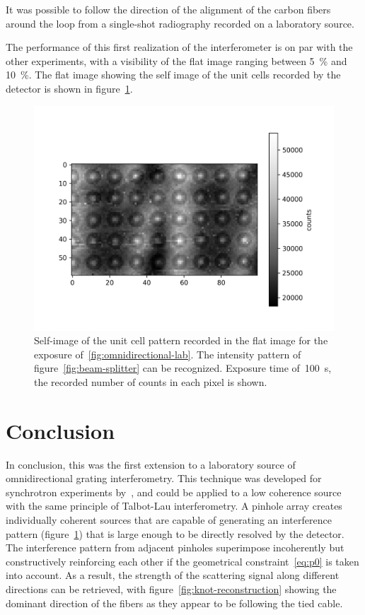 It was possible to follow the direction of the alignment of the
carbon fibers around the loop from a single-shot radiography recorded on a
laboratory source.

The performance of this first realization of the interferometer is on par
with the other experiments, with a visibility of the flat image ranging
between \SI{5}{\percent} and \SI{10}{\percent}. The flat image showing the
self image of the unit cells recorded by the detector is shown in
figure~\ref{fig:cells}.

\begin{figure}[htb]
    \centering
    \includegraphics[width=\textwidth]{gfx/omnidirectional/visibility-omnidirectional.png}
    \caption[Self-image of the omnidirectional interference pattern.]{Self-image of the unit cell pattern recorded in the flat image
        for the exposure of~\ref{fig:omnidirectional-lab}. The intensity
        pattern of figure~\ref{fig:beam-splitter} can be recognized.
        Exposure time of~\SI{100}{\second}, the recorded number of counts in
    each pixel is shown.}
    \label{fig:cells}
\end{figure}

\section{Conclusion}
In conclusion, this was the first extension to a laboratory source of
omnidirectional grating interferometry. This technique was developed for
synchrotron experiments by~\cite{PhysRevLett.116.093902}, and could be
applied to a low coherence source with the same principle of Talbot-Lau
interferometry. A pinhole array creates individually coherent sources that
are capable of generating an interference pattern (figure~\ref{fig:cells})
that is large enough to be directly resolved by the detector. The
interference pattern from adjacent pinholes superimpose incoherently but
constructively reinforcing each other if the geometrical
constraint~\eqref{eq:p0} is taken into account. As a result, the strength of
the scattering signal along different directions can be retrieved, with
figure~\ref{fig:knot-reconstruction} showing the dominant direction of the
fibers as they appear to be following the tied cable.
